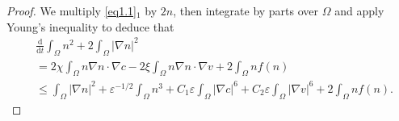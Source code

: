 \documentclass[reqno]{amsart}
\begin{document}
\begin{proof} 
We multiply \eqref{eq1.1}$_1$ by $2n$, then integrate by parts over $\Omega$ and 
apply Young's inequality to deduce that
\begin{equation}\label{eq-3.34}
\begin{aligned}
&\frac{\mathrm{d}}{\mathrm{d}t} \int_{\Omega} n^2 
+ 2\int_{\Omega} | \nabla n |^2
\\
&=2\chi \int_{\Omega} n \nabla n \cdot \nabla c - 2\xi \int_{\Omega} n \nabla n \cdot \nabla v + 2\int_{\Omega} n f(n)\\&\leq \int_{\Omega} |\nabla
n|^2 +\varepsilon^{-1/2}\int_{\Omega} n^3
+ C_1\varepsilon\int_{\Omega} |\nabla c|^6 
+ C_2\varepsilon\int_{\Omega} |\nabla v|^6+ 2\int_{\Omega} nf(n).
\end{aligned}
\end{equation}


\end{proof}
\end{document}
